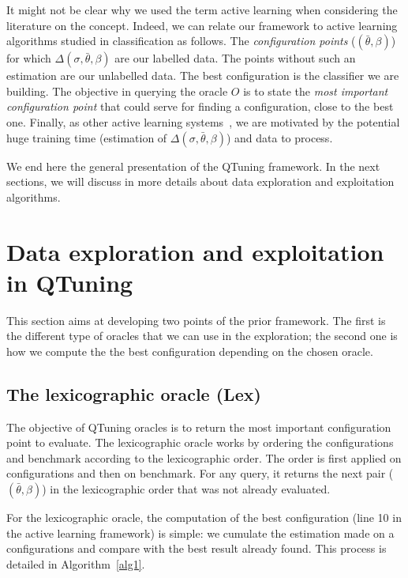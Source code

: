 \documentclass[10pt, conference, compsocconf]{IEEEtran}
\begin{document}
It might not be clear why we used the term active learning when considering the literature on the concept. 
Indeed, we can relate our framework to active learning algorithms studied in 
classification as follows. The {\it configuration points} ($(\bar{\theta}, \beta)$) for 
which  $\Delta(\sigma, \bar{\theta}, \beta)$ are our labelled data. The points without such an estimation 
are our unlabelled data. The best configuration is the classifier we are building. The objective  
in querying the oracle $O$ is to state the {\it most important configuration point} that could serve for finding a 
configuration, close to the best one. Finally, as other active learning systems~\cite{Chu:2011:UOA:2020408.2020444}, 
we are motivated by the potential huge training time (estimation of $\Delta(\sigma, \bar{\theta}, \beta)$) and  
data to process. 

We end here the general presentation of the QTuning framework. In the next sections, we will 
discuss in more details about data exploration and exploitation algorithms.



\section{Data exploration and exploitation in QTuning} \label{Exploration}

This section aims at developing two points of the prior framework. The first is the 
different type of oracles that we can use in the exploration; the second one is how we compute the 
 the best configuration depending on the chosen  oracle. 

\subsection{The lexicographic  oracle (Lex)}

The objective of QTuning oracles is to return the most important configuration point to evaluate.
The lexicographic  oracle works by ordering the configurations and benchmark according to the lexicographic order. 
The order is first applied on configurations and then on benchmark. For any query, it returns the next pair 
($(\bar{\theta}, \beta)$) in the lexicographic order that was not already evaluated. 

For the lexicographic  oracle, the computation of the best configuration (line 10 in the active learning framework) 
is simple: we cumulate the estimation made on a configurations and compare with the best result already found. 
This process is detailed in Algorithm~\ref{alg1}. 
\end{document}
